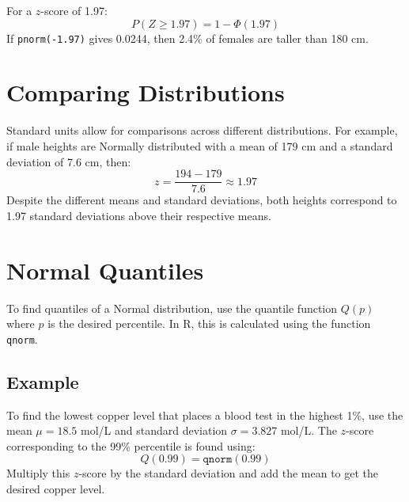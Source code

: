 \documentclass{article}
\begin{document}
For a \( z \)-score of 1.97:
\[
P(Z \geq 1.97) = 1 - \Phi(1.97)
\]
If \texttt{pnorm(-1.97)} gives 0.0244, then 2.4\% of females are taller than 180 cm.

\section{Comparing Distributions}
Standard units allow for comparisons across different distributions. For example, if male heights are Normally distributed with a mean of 179 cm and a standard deviation of 7.6 cm, then:
\[
z = \frac{194 - 179}{7.6} \approx 1.97
\]
Despite the different means and standard deviations, both heights correspond to 1.97 standard deviations above their respective means.

\section{Normal Quantiles}
To find quantiles of a Normal distribution, use the quantile function \( Q(p) \) where \( p \) is the desired percentile. In R, this is calculated using the function \texttt{qnorm}.

\subsection{Example}
To find the lowest copper level that places a blood test in the highest 1\%, use the mean \( \mu = 18.5 \) mol/L and standard deviation \( \sigma = 3.827 \) mol/L. The \( z \)-score corresponding to the 99\% percentile is found using:
\[
Q(0.99) = \texttt{qnorm}(0.99)
\]
Multiply this \( z \)-score by the standard deviation and add the mean to get the desired copper level.
\end{document}
